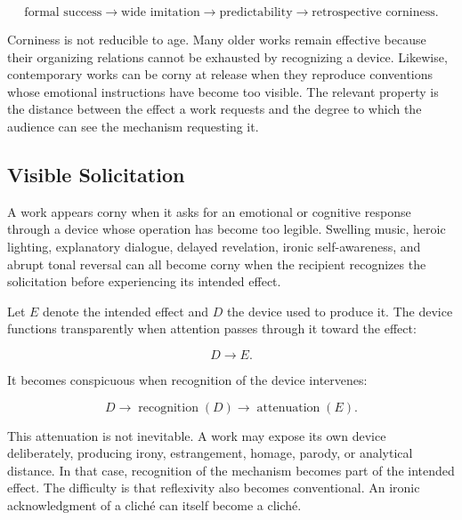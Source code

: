 \documentclass[11pt]{article}
\begin{document}
\begin{equation}
  \text{formal success}
  \longrightarrow
  \text{wide imitation}
  \longrightarrow
  \text{predictability}
  \longrightarrow
  \text{retrospective corniness}.
  \label{eq:success-corniness}
\end{equation}

Corniness is not reducible to age. Many older works remain effective because
their organizing relations cannot be exhausted by recognizing a device.
Likewise, contemporary works can be corny at release when they reproduce
conventions whose emotional instructions have become too visible. The
relevant property is the distance between the effect a work requests and the
degree to which the audience can see the mechanism requesting it.

\subsection{Visible Solicitation}

A work appears corny when it asks for an emotional or cognitive response
through a device whose operation has become too legible. Swelling music,
heroic lighting, explanatory dialogue, delayed revelation, ironic
self-awareness, and abrupt tonal reversal can all become corny when the
recipient recognizes the solicitation before experiencing its intended
effect.

Let \(E\) denote the intended effect and \(D\) the device used to produce it.
The device functions transparently when attention passes through it toward
the effect:

\begin{equation}
  D \longrightarrow E.
  \label{eq:transparent-device}
\end{equation}

It becomes conspicuous when recognition of the device intervenes:

\begin{equation}
  D
  \longrightarrow
  \operatorname{recognition}(D)
  \longrightarrow
  \operatorname{attenuation}(E).
  \label{eq:conspicuous-device}
\end{equation}

This attenuation is not inevitable. A work may expose its own device
deliberately, producing irony, estrangement, homage, parody, or analytical
distance. In that case, recognition of the mechanism becomes part of the
intended effect. The difficulty is that reflexivity also becomes conventional.
An ironic acknowledgment of a cliché can itself become a cliché.
\end{document}
